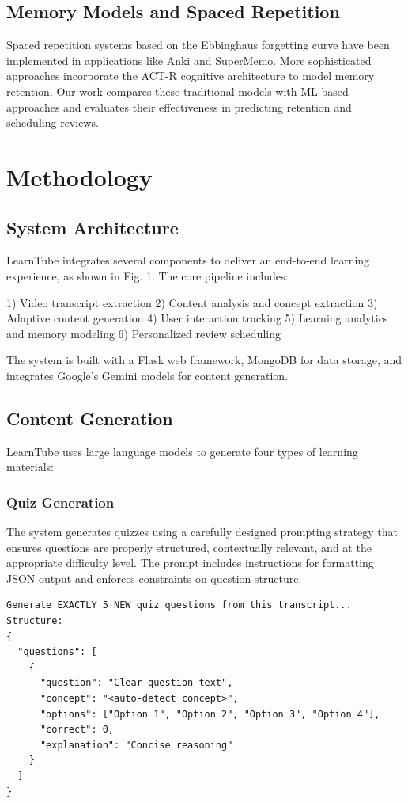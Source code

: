 \documentclass[conference]{IEEEtran}
\begin{document}
\subsection{Memory Models and Spaced Repetition}
Spaced repetition systems based on the Ebbinghaus forgetting curve \cite{r7} have been implemented in applications like Anki and SuperMemo. More sophisticated approaches incorporate the ACT-R cognitive architecture \cite{r8} to model memory retention. Our work compares these traditional models with ML-based approaches and evaluates their effectiveness in predicting retention and scheduling reviews.

\section{Methodology}
\subsection{System Architecture}
LearnTube integrates several components to deliver an end-to-end learning experience, as shown in Fig. 1. The core pipeline includes:

1) Video transcript extraction
2) Content analysis and concept extraction
3) Adaptive content generation
4) User interaction tracking
5) Learning analytics and memory modeling
6) Personalized review scheduling

The system is built with a Flask web framework, MongoDB for data storage, and integrates Google's Gemini models for content generation.

\subsection{Content Generation}
LearnTube uses large language models to generate four types of learning materials:

\subsubsection{Quiz Generation}
The system generates quizzes using a carefully designed prompting strategy that ensures questions are properly structured, contextually relevant, and at the appropriate difficulty level. The prompt includes instructions for formatting JSON output and enforces constraints on question structure:

\begin{verbatim}
Generate EXACTLY 5 NEW quiz questions from this transcript...
Structure:
{
  "questions": [
    {
      "question": "Clear question text",
      "concept": "<auto-detect concept>",
      "options": ["Option 1", "Option 2", "Option 3", "Option 4"],
      "correct": 0,
      "explanation": "Concise reasoning"
    }
  ]
}
\end{verbatim}
\end{document}
